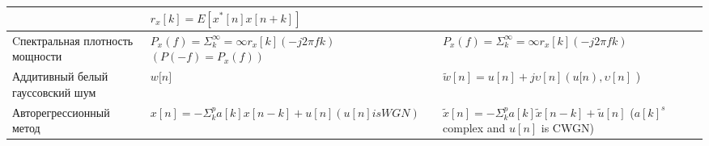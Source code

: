 \begin{table} [htbp]
\begin{tabular}{| p{4cm} || p{6cm} | p{6cm} |}
		&  $r_x[k]=E[x^*[n]x[n+k]]$ \\
		\hline
		Cпектральная плотность мощности & $P_x(f)=\Sigma_k^\infty=\infty r_x[k](-j2\pi fk)$  
		$(P(-f)=P_x(f))$               
		& $P_x(f)=\Sigma_k^\infty=\infty r_x[k](-j2\pi fk)$ \\
		\hline
		Аддитивный белый гауссовский шум & $w{[}n{]}$                       
		&$\widetilde{w}[n]=u[n]+j\upsilon[n]  
		(u[n),\upsilon[n]$ \linebreak) \\
		\hline
		Авторегрессионный метод &
		$x[n]=-\Sigma_k^p a[k]x[n-k]+u[n] (u[n] is WGN)$
		& $\widetilde{x}[n]=-\Sigma_k^p a[k]\widetilde{x}[n-k]+\widetilde{u}[n]$  \linebreak  
		($a[k]^s$ complex and $u[n]$ is CWGN) \\
		\hline
		\hline
	\end{tabular}
\end{table}






